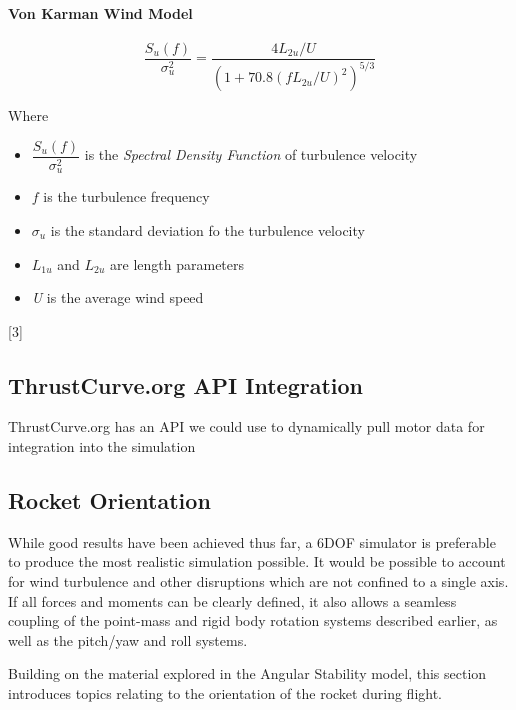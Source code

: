 \documentclass[]{article}
\providecommand{\tightlist}{%
  \setlength{\itemsep}{0pt}\setlength{\parskip}{0pt}}
\let\oldparagraph\paragraph
\renewcommand{\paragraph}[1]{\oldparagraph{#1}\mbox{}}
\begin{document}
\paragraph{Von Karman Wind Model}\label{von-karman-wind-model}

\begin{equation}
\label{eq_von_karman_wind_model}
\dfrac{S_u (f)}{\sigma ^2 _ u} = \dfrac{4 L_{2u} / U }{(1+ 70.8 (fL_{2u} / U)^2 )^{5/3}}
\end{equation}

Where

\begin{itemize}
\tightlist
\item
  \(\dfrac{S_u (f)}{\sigma ^2 _ u}\) is the \emph{Spectral Density
  Function} of turbulence velocity
\item
  \(f\) is the turbulence frequency
\item
  \(\sigma_u\) is the standard deviation fo the turbulence velocity
\item
  \(L_{1u}\) and \(L_{2u}\) are length parameters
\item
  \emph{U} is the average wind speed
\end{itemize}

{[}3{]}

\subsection{ThrustCurve.org API
Integration}\label{thrustcurve.org-api-integration}

ThrustCurve.org has an API we could use to dynamically pull motor data
for integration into the simulation

\subsection{Rocket Orientation}\label{rocket-orientation}

While good results have been achieved thus far, a 6DOF simulator is
preferable to produce the most realistic simulation possible. It would
be possible to account for wind turbulence and other disruptions which
are not confined to a single axis. If all forces and moments can be
clearly defined, it also allows a seamless coupling of the point-mass
and rigid body rotation systems described earlier, as well as the
pitch/yaw and roll systems.

Building on the material explored in the Angular Stability model, this
section introduces topics relating to the orientation of the rocket
during flight.
\end{document}
